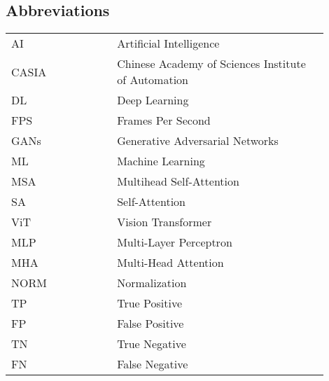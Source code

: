 \begin{center}
    \section*{Abbreviations}
    \begin{table}[h]
        \centering
        \renewcommand{\arraystretch}{1.5}
        \begin{tabular}{@{}p{0.3\linewidth}p{0.6\linewidth}@{}}
            AI    & Artificial Intelligence                             \\
            CASIA & Chinese Academy of Sciences Institute of Automation \\
            DL    & Deep Learning                                       \\
            FPS   & Frames Per Second                                   \\
            GANs  & Generative Adversarial Networks                     \\
            ML    & Machine Learning                                    \\
            MSA   & Multihead Self-Attention                            \\
            SA    & Self-Attention                                      \\
            ViT   & Vision Transformer                                  \\
            MLP   & Multi-Layer Perceptron                             \\
            MHA   & Multi-Head Attention                                \\
            NORM  & Normalization                                       \\
            TP  & True Positive                                      \\
            FP  & False Positive                                      \\
            TN  & True Negative                                      \\
            FN  & False Negative                                      \\
        \end{tabular}
    \end{table}
\end{center}
